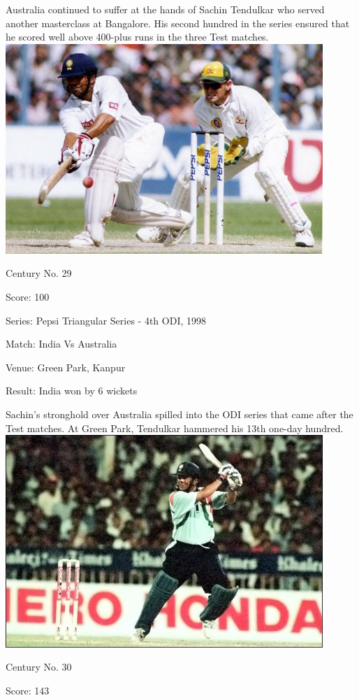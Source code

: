 \documentclass[11pt, a4paper]{article}
\begin{document}
Australia continued to suffer at the hands of Sachin Tendulkar who served another masterclass at Bangalore. His second hundred in the series ensured that he scored well above 400-plus runs in the three Test matches.
\newpage
\includegraphics[width=0.9\textwidth]{pics/29.jpg}

Century No. 29

Score: 100

Series: Pepsi Triangular Series - 4th ODI, 1998

Match: India Vs Australia

Venue: Green Park, Kanpur

Result: India won by 6 wickets

Sachin's stronghold over Australia spilled into the ODI series that came after the Test matches. At Green Park, Tendulkar hammered his 13th one-day hundred.
\newpage
\includegraphics[width=0.9\textwidth]{pics/30.jpg}

Century No. 30

Score: 143
\end{document}
